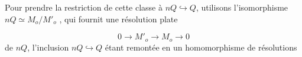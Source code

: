 \begin{center}
\end{center}
Pour prendre la restriction de cette classe à $nQ \hookrightarrow Q$, utilisons l'isomorphisme $nQ \simeq M_o/M'_o$ , qui fournit une résolution plate

\begin{equation*}
0 \longrightarrow M'_o \longrightarrow M_o \longrightarrow 0
\end{equation*}
de $nQ$, l'inclusion $nQ \hookrightarrow Q$ étant remontée en un homomorphisme de résolutions

